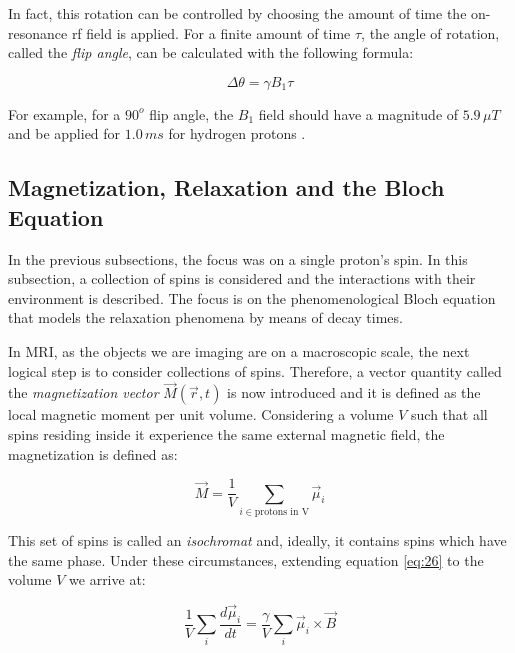 In fact, this rotation can be controlled by choosing the amount of time the on-resonance rf field is applied. For a finite amount of time $\tau$, the angle of rotation, called the \textit{flip angle}, can be calculated with the following formula:

\begin{equation} \label{eq:218}
    \Delta \theta = \gamma B_1 \tau
\end{equation}

For example, for a $90^o$ flip angle, the $B_1$ field should have a magnitude of $5.9 \, \mu T$ and be applied for $1.0 \, ms$ for hydrogen protons \cite{Haacke1999}.


\subsection{Magnetization, Relaxation and the Bloch Equation}
In the previous subsections, the focus was on a single proton's spin. 
In this subsection, a collection of spins is considered and the interactions with their environment is described. The focus is on the phenomenological Bloch equation that models the relaxation phenomena by means of decay times.

In MRI, as the objects we are imaging are on a macroscopic scale, the next logical step is to consider collections of spins. Therefore, a vector quantity called the \textit{magnetization vector} $\vec{M}(\vec{r},t)$ is now introduced and it is defined as the local magnetic moment per unit volume. Considering a volume $V$ such that all spins residing inside it experience the same external magnetic field, the magnetization is defined as:

\begin{equation} \label{eq:219}
    \vec{M} = \frac{1}{V} \sum_{i \in \text{protons in V}} \vec{\mu}_i
\end{equation}

This set of spins is called an \textit{isochromat} and, ideally, it contains spins which have the same phase. Under these circumstances, extending equation \ref{eq:26} to the volume $V$ we arrive at:

\begin{equation} \label{eq:220}
    \frac{1}{V} \sum_i \frac{d\vec{\mu}_i}{dt} = \frac{\gamma}{V} \sum_i \vec{\mu}_i \times \vec{B}
\end{equation}

